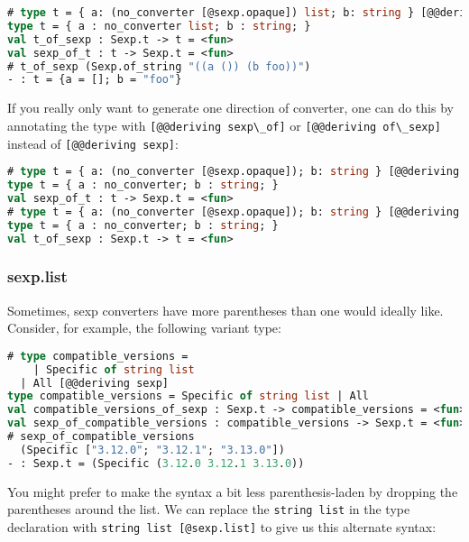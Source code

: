\begin{lstlisting}[language=Caml]
# type t = { a: (no_converter [@sexp.opaque]) list; b: string } [@@deriving sexp]
type t = { a : no_converter list; b : string; }
val t_of_sexp : Sexp.t -> t = <fun>
val sexp_of_t : t -> Sexp.t = <fun>
# t_of_sexp (Sexp.of_string "((a ()) (b foo))")
- : t = {a = []; b = "foo"}
\end{lstlisting}

If you really only want to generate one direction of converter, one can
do this by annotating the type with
\passthrough{\lstinline![@@deriving sexp\_of]!} or
\passthrough{\lstinline![@@deriving of\_sexp]!} instead of
\passthrough{\lstinline![@@deriving sexp]!}:

\begin{lstlisting}[language=Caml]
# type t = { a: (no_converter [@sexp.opaque]); b: string } [@@deriving sexp_of]
type t = { a : no_converter; b : string; }
val sexp_of_t : t -> Sexp.t = <fun>
# type t = { a: (no_converter [@sexp.opaque]); b: string } [@@deriving of_sexp]
type t = { a : no_converter; b : string; }
val t_of_sexp : Sexp.t -> t = <fun>
\end{lstlisting}

\hypertarget{sexp_list}{%
\subsubsection{sexp.list}\label{sexp_list}}

Sometimes, sexp converters have more parentheses than one would ideally
like. Consider, for example, the following variant type: 

\begin{lstlisting}[language=Caml]
# type compatible_versions =
    | Specific of string list
  | All [@@deriving sexp]
type compatible_versions = Specific of string list | All
val compatible_versions_of_sexp : Sexp.t -> compatible_versions = <fun>
val sexp_of_compatible_versions : compatible_versions -> Sexp.t = <fun>
# sexp_of_compatible_versions
  (Specific ["3.12.0"; "3.12.1"; "3.13.0"])
- : Sexp.t = (Specific (3.12.0 3.12.1 3.13.0))
\end{lstlisting}

You might prefer to make the syntax a bit less parenthesis-laden by
dropping the parentheses around the list. We can replace the
\passthrough{\lstinline!string list!} in the type declaration with
\passthrough{\lstinline!string list [@sexp.list]!} to give us this
alternate syntax:

